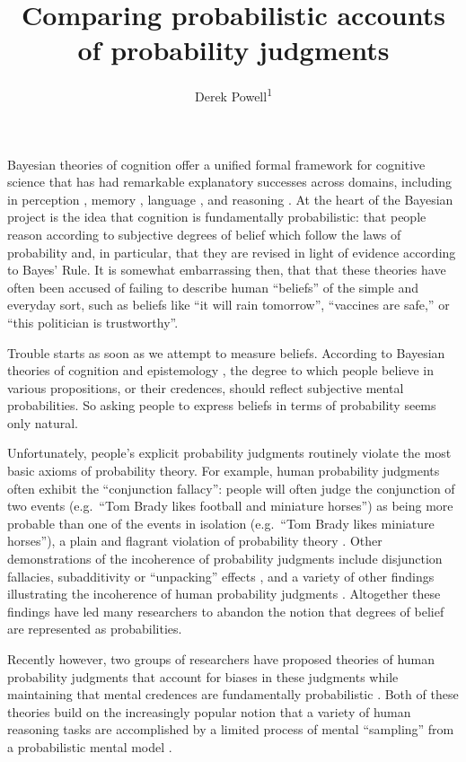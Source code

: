\documentclass[
  english,
  man,floatsintext]{apa6}
\title{Comparing probabilistic accounts of probability judgments}
\author{Derek Powell\textsuperscript{1}}
\date{}
\affiliation{\vspace{0.5cm}\textsuperscript{1} Arizona State University, School of Social and Behavioral Sciences}
\begin{document}
\maketitle

Bayesian theories of cognition offer a unified formal framework for cognitive science \autocite{tenenbaum.etal2011} that has had remarkable explanatory successes across domains, including in perception \autocite[e.g.][]{kersten.etal2004}, memory \autocite[e.g.][]{anderson1991}, language \autocite[e.g.][]{xu.tenenbaum2007}, and reasoning \autocite[e.g.][]{lu.etal2012}. At the heart of the Bayesian project is the idea that cognition is fundamentally probabilistic: that people reason according to subjective degrees of belief which follow the laws of probability and, in particular, that they are revised in light of evidence according to Bayes' Rule. It is somewhat embarrassing then, that that these theories have often been accused of failing to describe human ``beliefs'' of the simple and everyday sort, such as beliefs like ``it will rain tomorrow'', ``vaccines are safe,'' or ``this politician is trustworthy''.

Trouble starts as soon as we attempt to measure beliefs. According to Bayesian theories of cognition and epistemology \autocite{jaynes2003}, the degree to which people believe in various propositions, or their credences, should reflect subjective mental probabilities. So asking people to express beliefs in terms of probability seems only natural.

Unfortunately, people's explicit probability judgments routinely violate the most basic axioms of probability theory. For example, human probability judgments often exhibit the ``conjunction fallacy'': people will often judge the conjunction of two events (e.g.~``Tom Brady likes football and miniature horses'') as being more probable than one of the events in isolation (e.g.~``Tom Brady likes miniature horses''), a plain and flagrant violation of probability theory \autocite{tversky.kahneman1983}. Other demonstrations of the incoherence of probability judgments include disjunction fallacies, subadditivity or ``unpacking'' effects \autocite{tversky.koehler1994}, and a variety of other findings illustrating the incoherence of human probability judgments \autocite[for an accessible review, see][]{kahneman2013}. Altogether these findings have led many researchers to abandon the notion that degrees of belief are represented as probabilities.

Recently however, two groups of researchers have proposed theories of human probability judgments that account for biases in these judgments while maintaining that mental credences are fundamentally probabilistic \autocite{costello.watts2014,zhu.etal2020}. Both of these theories build on the increasingly popular notion that a variety of human reasoning tasks are accomplished by a limited process of mental ``sampling'' from a probabilistic mental model \autocites[see also][]{chater.etal2020,dasgupta.etal2017}.
\end{document}
